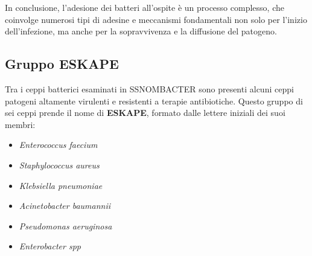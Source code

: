 \documentclass[../main.tex]{subfiles}
\begin{document}
In conclusione, l’adesione dei batteri all’ospite è un processo complesso, che coinvolge numerosi tipi di adesine e meccanismi fondamentali non solo per l’inizio dell’infezione, ma anche per la sopravvivenza e la diffusione del patogeno.\bigskip

\subsection{Gruppo ESKAPE}

Tra i ceppi batterici esaminati in SSNOMBACTER sono presenti alcuni ceppi patogeni altamente virulenti e resistenti a terapie antibiotiche. Questo gruppo di sei ceppi prende il nome di \textbf{ESKAPE}, formato dalle lettere iniziali dei suoi membri:

\begin{itemize}
	\itemsep0em
	\item \textit{Enterococcus faecium}
	\item \textit{Staphylococcus aureus}
	\item \textit{Klebsiella pneumoniae}
	\item \textit{Acinetobacter baumannii}
	\item \textit{Pseudomonas aeruginosa}
	\item \textit{Enterobacter spp}
\end{itemize}
\end{document}
